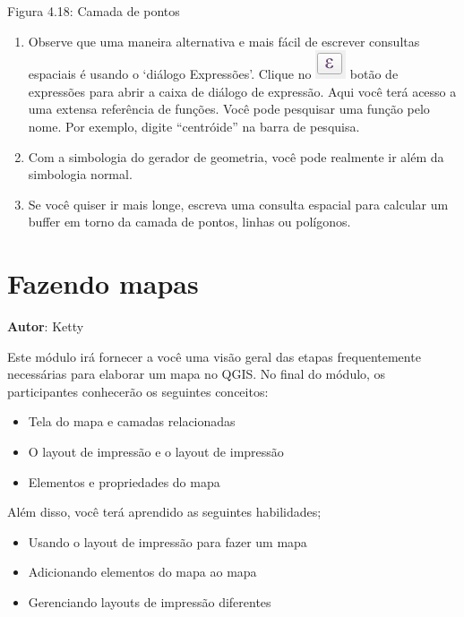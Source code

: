 \documentclass[
]{krantz}
\providecommand{\tightlist}{%
  \setlength{\itemsep}{0pt}\setlength{\parskip}{0pt}}
\begin{document}
Figura 4.18: Camada de pontos

\begin{enumerate}
\def\labelenumi{\arabic{enumi}.}
\setcounter{enumi}{3}
\tightlist
\item
  Observe que uma maneira alternativa e mais fácil de escrever consultas espaciais é usando o `diálogo Expressões'. Clique no \includegraphics{media/modulo4/expression.png} botão de expressões para abrir a caixa de diálogo de expressão. Aqui você terá acesso a uma extensa referência de funções. Você pode pesquisar uma função pelo nome. Por exemplo, digite ``centróide'' na barra de pesquisa.
\item
  Com a simbologia do gerador de geometria, você pode realmente ir além da simbologia normal.
\item
  Se você quiser ir mais longe, escreva uma consulta espacial para calcular um buffer em torno da camada de pontos, linhas ou polígonos.
\end{enumerate}

\hypertarget{fazendo-mapas}{%
\chapter{Fazendo mapas}\label{fazendo-mapas}}

\textbf{Autor}: Ketty

Este módulo irá fornecer a você uma visão geral das etapas frequentemente necessárias para elaborar um mapa no QGIS. No final do módulo, os participantes conhecerão os seguintes conceitos:

\begin{itemize}
\tightlist
\item
  Tela do mapa e camadas relacionadas
\item
  O layout de impressão e o layout de impressão
\item
  Elementos e propriedades do mapa
\end{itemize}

Além disso, você terá aprendido as seguintes habilidades;

\begin{itemize}
\tightlist
\item
  Usando o layout de impressão para fazer um mapa
\item
  Adicionando elementos do mapa ao mapa
\item
  Gerenciando layouts de impressão diferentes
\end{itemize}
\end{document}
